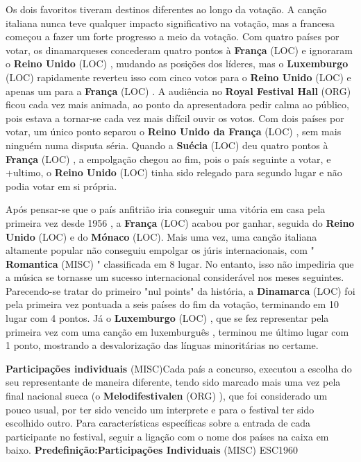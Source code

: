 \documentclass[12pt,a4paper]{article}
\begin{document}
Os dois favoritos tiveram destinos diferentes ao longo da votação. A canção italiana nunca teve qualquer impacto significativo na votação, mas a francesa começou a fazer um forte progresso a meio da votação. Com quatro países por votar, os dinamarqueses concederam quatro pontos à \textbf{França} (LOC) e ignoraram o \textbf{Reino Unido} (LOC) , mudando as posições dos líderes, mas o \textbf{Luxemburgo} (LOC) rapidamente reverteu isso com cinco votos para o \textbf{Reino Unido} (LOC) e apenas um para a \textbf{França} (LOC) . A audiência no \textbf{Royal Festival Hall} (ORG) ficou cada vez mais animada, ao ponto da apresentadora pedir calma ao público, pois estava a tornar-se cada vez mais difícil ouvir os votos. Com dois países por votar, um único ponto separou o \textbf{Reino Unido da França} (LOC) , sem mais ninguém numa disputa séria. Quando a \textbf{Suécia} (LOC) deu quatro pontos à \textbf{França} (LOC) , a empolgação chegou ao fim, pois o país seguinte a votar, e +ultimo, o \textbf{Reino Unido} (LOC) tinha sido relegado para segundo lugar e não podia votar em si própria.

Após pensar-se que o país anfitrião iria conseguir uma vitória em casa pela primeira vez desde 1956 , a \textbf{França} (LOC) acabou por ganhar, seguida do \textbf{Reino Unido} (LOC) e do \textbf{Mónaco} (LOC). Mais uma vez, uma canção italiana altamente popular não conseguiu empolgar os júris internacionais, com " \textbf{Romantica} (MISC) " classificada em 8 lugar. No entanto, isso não impediria que a música se tornasse um sucesso internacional considerável nos meses seguintes. Parecendo-se tratar do primeiro "nul points" da história, a \textbf{Dinamarca} (LOC) foi pela primeira vez pontuada a seis países do fim da votação, terminando em 10 lugar com 4 pontos. Já o \textbf{Luxemburgo} (LOC) , que se fez representar pela primeira vez com uma canção em luxemburguês , terminou me último lugar com 1 ponto, mostrando a desvalorização das línguas minoritárias no certame.



\textbf{Participações individuais} (MISC)Cada país a concurso, executou a escolha do seu representante de maneira diferente, tendo sido marcado mais uma vez pela final nacional sueca (o \textbf{Melodifestivalen} (ORG) ), que foi considerado um pouco usual, por ter sido vencido um interprete e para o festival ter sido escolhido outro. Para características específicas sobre a entrada de cada participante no festival, seguir a ligação com o nome dos países na caixa em baixo. \textbf{Predefinição:Participações Individuais} (MISC) ESC1960
\end{document}
